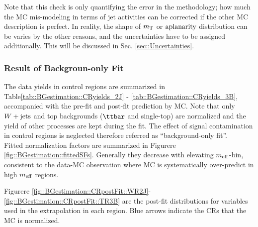 Note that this check is only quantifying the error in the methodology; how much the MC mis-modeling in terms of jet activities can be corrected if the other MC description is perfect.
In reality, the shape of $m_{\mathrm{T}}$ or $\mathrm{aplanarity}$ distribution can be varies by the other reasons, and the uncertainties have to be assigned additionally. This will be discussed in Sec. \ref{sec::Uncertainties}.

\clearpage
%



\clearpage

\subsubsection{Result of Backgroun-only Fit} \label{sec::BGestimation::kineExtp::result}
The data yields in control regions are summarized in Table\ref{tab::BGestimation::CRyields_2J} - \ref{tab::BGestimation::CRyields_3B}, accompanied with the pre-fit and post-fit prediction by MC. Note that only $W+\mathrm{jets}$ and top backgrounds ($\ttbar$ and single-top) are normalized and the yield of other processes are kept during the fit. The effect of signal contamination in control regions is neglected therefore referred as ``background-only fit''. \\

Fitted normalization factors are summarized in Figurere \ref{fig::BGestimation::fittedSFs}. Generally they decrease with elevating $m_{\mathrm{eff}}$-bin, consistent to the data-MC observation where MC is systematically over-predict in high $m_{\mathrm{eff}}$ regions.


\clearpage

Figurere \ref{fig::BGestimation::CRpostFit::WR2J}-\ref{fig::BGestimation::CRpostFit::TR3B} are the post-fit distributions for variables used in the extrapolation in each region. Blue arrows indicate the CRs that the MC is normalized. 
%


